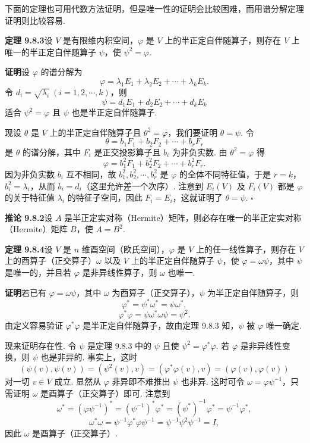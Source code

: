 \documentclass[UTF8,12pt,a4paper,fontset=fandol]{ctexart}
\begin{document}
下面的定理也可用代数方法证明，但是唯一性的证明会比较困难，而用谱分解定理证明则比较容易.

\noindent\textbf{定理 9.8.3}\quad 设 $V$ 是有限维内积空间，$\varphi$ 是 $V$ 上的半正定自伴随算子，则存在 $V$ 上唯一的半正定自伴随算子 $\psi$，使 $\psi^2=\varphi$.

\noindent\textbf{证明}\quad 设 $\varphi$ 的谱分解为
\[
  \varphi=\lambda_1E_1+\lambda_2E_2+\cdots+\lambda_kE_k.
\]
令 $d_i=\sqrt{\lambda_i}\ (i=1,2,\cdots,k)$，则
\[
  \psi=d_1E_1+d_2E_2+\cdots+d_kE_k
\]
适合 $\psi^2=\varphi$ 且 $\psi$ 也是半正定自伴随算子.

现设 $\theta$ 是 $V$ 上的半正定自伴随算子且 $\theta^2=\varphi$，我们要证明 $\theta=\psi$. 令
\[
  \theta=b_1F_1+b_2F_2+\cdots+b_rF_r
\]
是 $\theta$ 的谱分解，其中 $F_i$ 是正交投影算子且 $b_i$ 为非负实数. 由 $\theta^2=\varphi$ 得
\[
  \varphi=b_1^2F_1+b_2^2F_2+\cdots+b_r^2F_r.
\]
因为非负实数 $b_i$ 互不相同，故 $b_1^2,b_2^2,\cdots,b_r^2$ 是 $\varphi$ 的全体不同特征值，于是 $r=k$，$b_i^2=\lambda_i$，从而 $b_i=d_i$（这里允许差一个次序）. 注意到 $E_i(V)$ 及 $F_i(V)$ 都是 $\varphi$ 的关于特征值 $\lambda_i$ 的特征子空间，因此 $F_i=E_i$，这就证明了 $\theta=\psi$. $\square$

\noindent\textbf{推论 9.8.2}\quad 设 $A$ 是半正定实对称（Hermite）矩阵，则必存在唯一的半正定实对称（Hermite）矩阵 $B$，使 $A=B^2$.

\noindent\textbf{定理 9.8.4}\quad 设 $V$ 是 $n$ 维酉空间（欧氏空间），$\varphi$ 是 $V$ 上的任一线性算子，则存在 $V$ 上的酉算子（正交算子）$\omega$ 以及 $V$ 上的半正定自伴随算子 $\psi$，使 $\varphi=\omega\psi$，其中 $\psi$ 是唯一的，并且若 $\varphi$ 是非异线性算子，则 $\omega$ 也唯一.

\noindent\textbf{证明}\quad 若已有 $\varphi=\omega\psi$，其中 $\omega$ 为酉算子（正交算子），$\psi$ 为半正定自伴随算子，则
\[
  \varphi^*=\psi^*\omega^*=\psi\omega^*,
\]
\[
  \varphi^*\varphi=\psi\omega^*\omega\psi=\psi^2.
\]
由定义容易验证 $\varphi^*\varphi$ 是半正定自伴随算子，故由定理 9.8.3 知，$\psi$ 被 $\varphi$ 唯一确定.

现来证明存在性. 令 $\psi$ 是定理 9.8.3 中的 $\psi$ 且使 $\psi^2=\varphi^*\varphi$. 若 $\varphi$ 是非异线性变换，则 $\psi$ 也是非异的. 事实上，这时
\begin{equation}
  (\psi(v),\psi(v))=(\psi^2(v),v)=(\varphi^*\varphi(v),v)=(\varphi(v),\varphi(v))
  \tag{9.8.2}
\end{equation}
对一切 $v\in V$ 成立. 显然从 $\varphi$ 非异即不难推出 $\psi$ 也非异. 这时可令 $\omega=\varphi\psi^{-1}$，只需证明 $\omega$ 是酉算子（正交算子）即可. 注意到
\[
  \omega^*=(\varphi\psi^{-1})^*=(\psi^{-1})^*\varphi^*=(\psi^*)^{-1}\varphi^*=\psi^{-1}\varphi^*,
\]
\[
  \omega^*\omega=\psi^{-1}\varphi^*\varphi\psi^{-1}=\psi^{-1}\psi^2\psi^{-1}=I,
\]
因此 $\omega$ 是酉算子（正交算子）.
\end{document}
